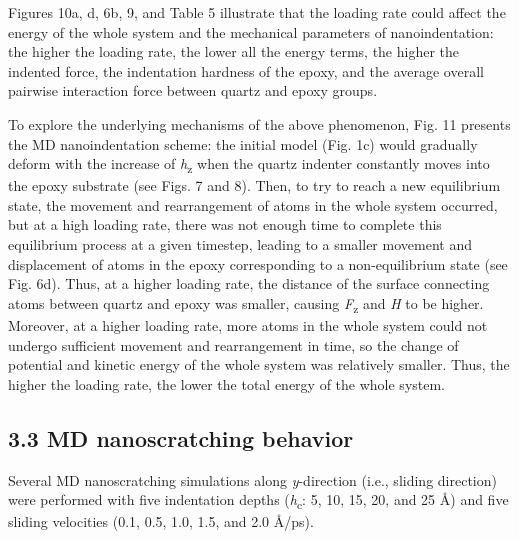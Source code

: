 \documentclass{article}
\begin{document}
Figures 10a, d, 6b, 9, and Table 5 illustrate that the loading rate could affect the energy of the whole system and the mechanical parameters of nanoindentation: the higher the loading rate, the lower all the energy terms, the higher the indented force, the indentation hardness of the epoxy, and the average overall pairwise interaction force between quartz and epoxy groups.

To explore the underlying mechanisms of the above phenomenon, Fig. 11 presents the MD nanoindentation scheme: the initial model (Fig. 1c) would gradually deform with the increase of \emph{h}\textsubscript{z} when the quartz indenter constantly moves into the epoxy substrate (see Figs. 7 and 8). Then, to try to reach a new equilibrium state, the movement and rearrangement of atoms in the whole system occurred, but at a high loading rate, there was not enough time to complete this equilibrium process at a given timestep, leading to a smaller movement and displacement of atoms in the epoxy corresponding to a non-equilibrium state (see Fig. 6d). Thus, at a higher loading rate, the distance of the surface connecting atoms between quartz and epoxy was smaller, causing \emph{F}\textsubscript{z} and \emph{H} to be higher. Moreover, at a higher loading rate, more atoms in the whole system could not undergo sufficient movement and rearrangement in time, so the change of potential and kinetic energy of the whole system was relatively smaller. Thus, the higher the loading rate, the lower the total energy of the whole system.

\subsection*{3.3 MD nanoscratching behavior}

Several MD nanoscratching simulations along \emph{y}-direction (i.e., sliding direction) were performed with five indentation depths (\emph{h}\textsubscript{c}: 5, 10, 15, 20, and 25 Å) and five sliding velocities (0.1, 0.5, 1.0, 1.5, and 2.0 Å/ps).
\end{document}
